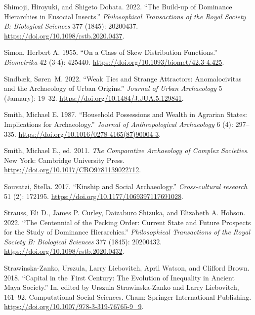 \documentclass[
  12pt,
  a4paper, twoside]{book}
\newlength{\cslhangindent}
\newlength{\cslentryspacingunit} %
\newenvironment{CSLReferences}[2] %
 {%
  \setlength{\parindent}{0pt}
  \ifodd #1
  \let\oldpar\par
  \def\par{\hangindent=\cslhangindent\oldpar}
  \fi
  \setlength{\parskip}{#2\cslentryspacingunit}
 }%
 {}
\begin{document}
\begin{CSLReferences}{1}{0}
\leavevmode{}%
Shimoji, Hiroyuki, and Shigeto Dobata. 2022. {``The Build-up of Dominance Hierarchies in Eusocial Insects.''} \emph{Philosophical Transactions of the Royal Society B: Biological Sciences} 377 (1845): 20200437. \url{https://doi.org/10.1098/rstb.2020.0437}.

\leavevmode{}%
Simon, Herbert A. 1955. {``On a Class of Skew Distribution Functions.''} \emph{Biometrika} 42 (3-4): 425440. \url{https://doi.org/10.1093/biomet/42.3-4.425}.

\leavevmode{}%
Sindbæk, Søren~M. 2022. {``Weak Ties and Strange Attractors: Anomalocivitas and the Archaeology of Urban Origins.''} \emph{Journal of Urban Archaeology} 5 (January): 19--32. \url{https://doi.org/10.1484/J.JUA.5.129841}.

\leavevmode{}%
Smith, Michael E. 1987. {``Household Possessions and Wealth in Agrarian States: Implications for Archaeology.''} \emph{Journal of Anthropological Archaeology} 6 (4): 297--335. \url{https://doi.org/10.1016/0278-4165(87)90004-3}.

\leavevmode{}%
Smith, Michael E., ed. 2011. \emph{The Comparative Archaeology of Complex Societies}. New York: Cambridge University Press. \url{https://doi.org/10.1017/CBO9781139022712}.

\leavevmode{}%
Souvatzi, Stella. 2017. {``Kinship and Social Archaeology.''} \emph{Cross-cultural research} 51 (2): 172195. \url{https://doi.org/10.1177/1069397117691028}.

\leavevmode{}%
Strauss, Eli D., James P. Curley, Daizaburo Shizuka, and Elizabeth A. Hobson. 2022. {``The Centennial of the Pecking Order: Current State and Future Prospects for the Study of Dominance Hierarchies.''} \emph{Philosophical Transactions of the Royal Society B: Biological Sciences} 377 (1845): 20200432. \url{https://doi.org/10.1098/rstb.2020.0432}.

\leavevmode{}%
Strawinska-Zanko, Urszula, Larry Liebovitch, April Watson, and Clifford Brown. 2018. {``Capital in the~First Century: The Evolution of Inequality in Ancient Maya Society.''} In, edited by Urszula Strawinska-Zanko and Larry Liebovitch, 161--92. Computational Social Sciences. Cham: Springer International Publishing. \url{https://doi.org/10.1007/978-3-319-76765-9_9}.


\end{CSLReferences}
\end{document}
